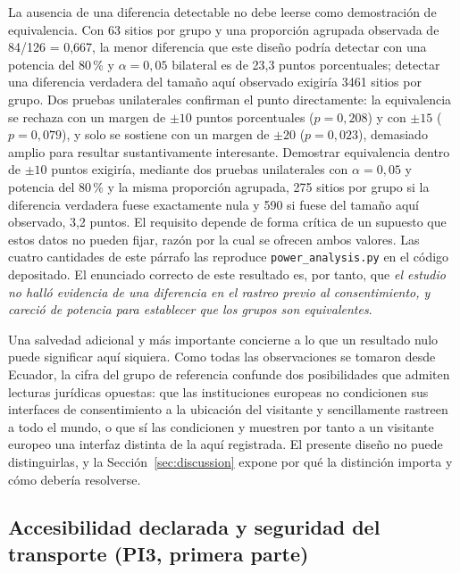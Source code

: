\documentclass[pdflatex,sn-basic,Numbered,iicol]{sn-jnl}
\theoremstyle{thmstyleone}
\theoremstyle{thmstyletwo}
\theoremstyle{thmstylethree}
\begin{document}
La ausencia de una diferencia detectable no debe leerse como demostraci\'on de equivalencia. Con 63 sitios por grupo y una proporci\'on agrupada observada de 84/126 = 0,667, la menor diferencia que este dise\~no podr\'ia detectar con una potencia del 80\,\% y $\alpha=0{,}05$ bilateral es de 23,3 puntos porcentuales; detectar una diferencia verdadera del tama\~no aqu\'i observado exigir\'ia 3461 sitios por grupo. Dos pruebas unilaterales confirman el punto directamente: la equivalencia se rechaza con un margen de $\pm 10$ puntos porcentuales ($p=0{,}208$) y con $\pm 15$ ($p=0{,}079$), y solo se sostiene con un margen de $\pm 20$ ($p=0{,}023$), demasiado amplio para resultar sustantivamente interesante. Demostrar equivalencia dentro de $\pm 10$ puntos exigir\'ia, mediante dos pruebas unilaterales con $\alpha=0{,}05$ y potencia del 80\,\% y la misma proporci\'on agrupada, 275 sitios por grupo si la diferencia verdadera fuese exactamente nula y 590 si fuese del tama\~no aqu\'i observado, 3,2 puntos. El requisito depende de forma cr\'itica de un supuesto que estos datos no pueden fijar, raz\'on por la cual se ofrecen ambos valores. Las cuatro cantidades de este p\'arrafo las reproduce \verb|power_analysis.py| en el c\'odigo depositado. El enunciado correcto de este resultado es, por tanto, que \emph{el estudio no hall\'o evidencia de una diferencia en el rastreo previo al consentimiento, y careci\'o de potencia para establecer que los grupos son equivalentes}.

Una salvedad adicional y m\'as importante concierne a lo que un resultado nulo puede significar aqu\'i siquiera. Como todas las observaciones se tomaron desde Ecuador, la cifra del grupo de referencia confunde dos posibilidades que admiten lecturas jur\'idicas opuestas: que las instituciones europeas no condicionen sus interfaces de consentimiento a la ubicaci\'on del visitante y sencillamente rastreen a todo el mundo, o que s\'i las condicionen y muestren por tanto a un visitante europeo una interfaz distinta de la aqu\'i registrada. El presente dise\~no no puede distinguirlas, y la Secci\'on~\ref{sec:discussion} expone por qu\'e la distinci\'on importa y c\'omo deber\'ia resolverse.

\subsection{Accesibilidad declarada y seguridad del transporte (PI3, primera parte)}\label{sec:results-declared}
\end{document}
